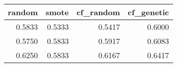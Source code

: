 \begin{tabular}{rrrr}
\toprule

 random &  smote &  cf\_random &  cf\_genetic \\
\midrule

 0.5833 & 0.5333 &     0.5417 &      0.6000 \\
 0.5750 & 0.5833 &     0.5917 &      0.6083 \\
 0.6250 & 0.5833 &     0.6167 &      0.6417 \\

\bottomrule
\end{tabular}
